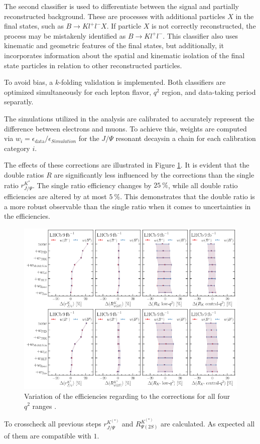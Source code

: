 The second classifier is used to differentiate between the signal and partially reconstructed 
background. These are processes with additional particles $X$ in the final states, such as 
$B\to K l^+l^- X$. If particle $X$ is not correctly reconstructed, the process may be mistakenly 
identified as $B \to K l^+l^-$. This classifier also uses kinematic and geometric features of 
the final states, but additionally, it incorporates information about the spatial and kinematic 
isolation of the final state particles in relation to other reconstructed particles.

To avoid bias, a $k$-folding validation is implemented. Both classifiers are optimized 
simultaneously for each lepton flavor, $q^2$ region, and data-taking period separatly.


The simulations utilized in the analysis are calibrated to accurately represent the difference 
between electrons and muons. To achieve this, weights are computed via 
$w_i=\epsilon_\text{data}/\epsilon_{Simulation}$ for the $J/\Psi$ resonant decaysin a chain 
for each calibration category $i$. 

The effects of these corrections are illustrated in Figure \ref{fig:weights}. 
It is evident that the double ratios $R$ are significantly less influenced by the corrections 
than the single ratio $r^{K^*}_{J/\Psi}$. The single ratio efficiency changes by $\SI{25}{\%}$, 
while all double ratio efficiencies are altered by at most $\SI{5}{\%}$. This demonstrates that 
the double ratio is a more robust observable than the single ratio when it comes to uncertainties 
in the efficiencies.

\begin{figure}
    \centering
    \includegraphics[width=\linewidth]{figures/weights.png}
    \caption{Variation of the efficiencies regarding to the corrections for all four $q^2$ ranges \cite{lhcbcollaboration2022test}.}
    \label{fig:weights}
\end{figure}
To crosscheck all previous steps $r^{K^{(*)}}_{J/\Psi}$ and $R^{K^{(*)}}_{\Psi(2S)}$ are 
calculated. As expected all of them are compatible with $\num{1}$.

